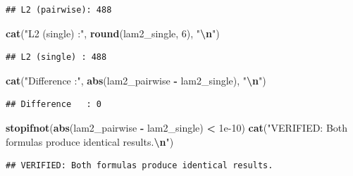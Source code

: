 \documentclass[
]{article}
\newenvironment{Shaded}{\begin{snugshade}}{\end{snugshade}}
\newcommand{\DecValTok}[1]{\textcolor[rgb]{0.00,0.00,0.81}{#1}}
\newcommand{\FloatTok}[1]{\textcolor[rgb]{0.00,0.00,0.81}{#1}}
\newcommand{\FunctionTok}[1]{\textcolor[rgb]{0.13,0.29,0.53}{\textbf{#1}}}
\newcommand{\NormalTok}[1]{#1}
\newcommand{\SpecialCharTok}[1]{\textcolor[rgb]{0.81,0.36,0.00}{\textbf{#1}}}
\newcommand{\StringTok}[1]{\textcolor[rgb]{0.31,0.60,0.02}{#1}}
\begin{document}
\begin{verbatim}
## L2 (pairwise): 488
\end{verbatim}

\begin{Shaded}
\begin{Highlighting}[]
\FunctionTok{cat}\NormalTok{(}\StringTok{"L2 (single) :"}\NormalTok{, }\FunctionTok{round}\NormalTok{(lam2\_single, }\DecValTok{6}\NormalTok{), }\StringTok{"}\SpecialCharTok{\textbackslash{}n}\StringTok{"}\NormalTok{)}
\end{Highlighting}
\end{Shaded}

\begin{verbatim}
## L2 (single) : 488
\end{verbatim}

\begin{Shaded}
\begin{Highlighting}[]
\FunctionTok{cat}\NormalTok{(}\StringTok{"Difference   :"}\NormalTok{, }\FunctionTok{abs}\NormalTok{(lam2\_pairwise }\SpecialCharTok{{-}}\NormalTok{ lam2\_single), }\StringTok{"}\SpecialCharTok{\textbackslash{}n}\StringTok{"}\NormalTok{)}
\end{Highlighting}
\end{Shaded}

\begin{verbatim}
## Difference   : 0
\end{verbatim}

\begin{Shaded}
\begin{Highlighting}[]
\FunctionTok{stopifnot}\NormalTok{(}\FunctionTok{abs}\NormalTok{(lam2\_pairwise }\SpecialCharTok{{-}}\NormalTok{ lam2\_single) }\SpecialCharTok{\textless{}} \FloatTok{1e{-}10}\NormalTok{)}
\FunctionTok{cat}\NormalTok{(}\StringTok{"VERIFIED: Both formulas produce identical results.}\SpecialCharTok{\textbackslash{}n}\StringTok{"}\NormalTok{)}
\end{Highlighting}
\end{Shaded}

\begin{verbatim}
## VERIFIED: Both formulas produce identical results.
\end{verbatim}
\end{document}
